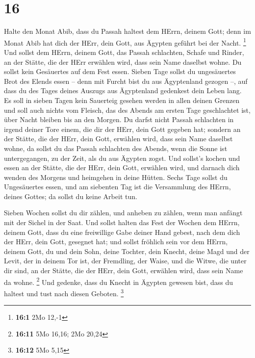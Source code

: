 \hypertarget{section-1}{%
\section{16}\label{section-1}}

 Halte den Monat Abib, dass du Passah haltest dem HErrn,
deinem Gott; denn im Monat Abib hat dich der HErr, dein Gott, aus
Ägypten geführt bei der Nacht. \footnote{\textbf{16:1} 2Mo 12,-1}
 Und sollst dem HErrn, deinem Gott, das Passah schlachten,
Schafe und Rinder, an der Stätte, die der HErr erwählen wird, dass sein
Name daselbst wohne.  Du sollst kein Gesäuertes auf dem Fest
essen. Sieben Tage sollst du ungesäuertes Brot des Elends essen -- denn
mit Furcht bist du aus Ägyptenland gezogen --, auf dass du des Tages
deines Auszugs aus Ägyptenland gedenkest dein Leben lang. 
Es soll in sieben Tagen kein Sauerteig gesehen werden in allen deinen
Grenzen und soll auch nichts vom Fleisch, das des Abends am ersten Tage
geschlachtet ist, über Nacht bleiben bis an den Morgen.  Du
darfst nicht Passah schlachten in irgend deiner Tore einem, die dir der
HErr, dein Gott gegeben hat;  sondern an der Stätte, die der
HErr, dein Gott, erwählen wird, dass sein Name daselbst wohne, da sollst
du das Passah schlachten des Abends, wenn die Sonne ist untergegangen,
zu der Zeit, als du aus Ägypten zogst.  Und sollst's kochen
und essen an der Stätte, die der HErr, dein Gott, erwählen wird, und
darnach dich wenden des Morgens und heimgehen in deine Hütten.
 Sechs Tage sollst du Ungesäuertes essen, und am siebenten
Tag ist die Versammlung des HErrn, deines Gottes; da sollst du keine
Arbeit tun.

 Sieben Wochen sollst du dir zählen, und anheben zu zählen,
wenn man anfängt mit der Sichel in der Saat.  Und sollst
halten das Fest der Wochen dem HErrn, deinem Gott, dass du eine
freiwillige Gabe deiner Hand gebest, nach dem dich der HErr, dein Gott,
gesegnet hat;  und sollst fröhlich sein vor dem HErrn,
deinem Gott, du und dein Sohn, deine Tochter, dein Knecht, deine Magd
und der Levit, der in deinem Tor ist, der Fremdling, der Waise, und die
Witwe, die unter dir sind, an der Stätte, die der HErr, dein Gott,
erwählen wird, dass sein Name da wohne. \footnote{\textbf{16:11} 5Mo
  16,16; 2Mo 20,24}  Und gedenke, dass du Knecht in Ägypten
gewesen bist, dass du haltest und tust nach diesen Geboten. \footnote{\textbf{16:12}
  5Mo 5,15}

